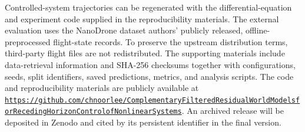 {\sloppy Controlled-system trajectories can be regenerated with the
differential-equation and experiment code supplied in the reproducibility
materials. The external evaluation uses the NanoDrone dataset authors'
publicly released, offline-preprocessed flight-state records. To preserve the
upstream distribution terms, third-party flight files are not redistributed.
The supporting materials include data-retrieval information and SHA-256
checksums together with configurations, seeds, split identifiers, saved
predictions, metrics, and analysis scripts. The code and reproducibility
materials are publicly available at
\href{https://github.com/chnoorlee/Complementary-Filtered-Residual-World-Models-for-Receding-Horizon-Control-of-Nonlinear-Systems}{\texttt{https://\allowbreak github.com/\allowbreak chnoorlee/\allowbreak Complementary\-Filtered\-Residual\-World\-Models\-for\-Receding\-Horizon\-Control\-of\-Nonlinear\-Systems}}.
An archived release will be deposited in Zenodo and cited by its persistent
identifier in the final version.\par}
